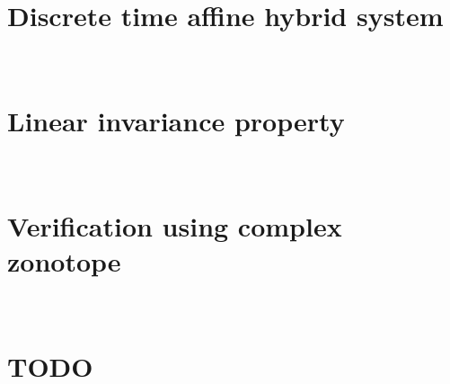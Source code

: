 \section{Discrete time affine hybrid system}~\label{sec:hybrid-system}


\section{Linear invariance property}~\label{sec:linear-invariance}


\section{Verification using complex zonotope}~\label{sec:verification-invariance}


\section{TODO}